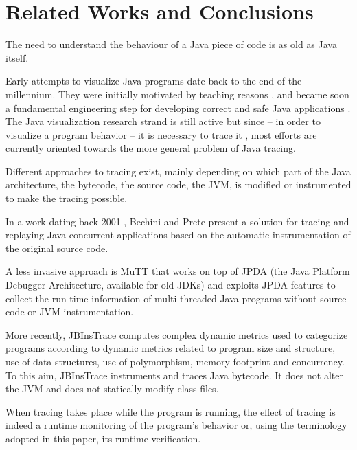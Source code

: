 \section{Related Works and Conclusions}
\label{sec:rel-concl}

The need to understand the behaviour of a Java piece of code is as old as Java itself. 

Early attempts to visualize Java programs date back to the end of the millennium. They were initially motivated by teaching reasons \cite{dershem1999java}, and became soon a fundamental engineering step for developing correct and safe Java applications \cite{DBLP:conf/wcre/Systa00,DBLP:conf/dagstuhl/PauwJMSVY01}. The Java visualization research strand is still active \cite{DBLP:journals/spe/JayaramanJL17,DBLP:journals/spe/PJJS21} but since -- in order to visualize a program behavior -- it is necessary to trace it \cite{DBLP:conf/dagstuhl/Mehner01}, most efforts are currently oriented towards the more general problem of Java tracing.

Different approaches to tracing exist, mainly depending on which part of the Java architecture, the bytecode, the source code, the JVM, is modified or instrumented to make the tracing possible.

In a work dating back 2001 \cite{DBLP:journals/fgcs/BechiniP01}, Bechini and Prete present a solution for tracing and replaying Java concurrent applications based on the automatic instrumentation of the original source code.

A less invasive approach is MuTT \cite{DBLP:conf/ACISicis/LiuX09} that works on top of JPDA (the Java Platform Debugger Architecture, available for old JDKs) and exploits JPDA features to collect the run-time information of multi-threaded Java programs without source code or JVM instrumentation.

More recently, JBInsTrace \cite{DBLP:journals/scp/CasertaZ14} computes complex dynamic metrics used to categorize programs according to dynamic metrics related to program size and structure, use of data structures, use of
polymorphism, memory footprint and concurrency. 
To this aim, JBInsTrace instruments and traces Java bytecode. It does not alter the JVM and does not statically modify class files. 

When tracing takes place while the program is running, the effect of tracing is indeed a runtime monitoring of the program's behavior or, using the terminology adopted in this paper, its runtime verification.

